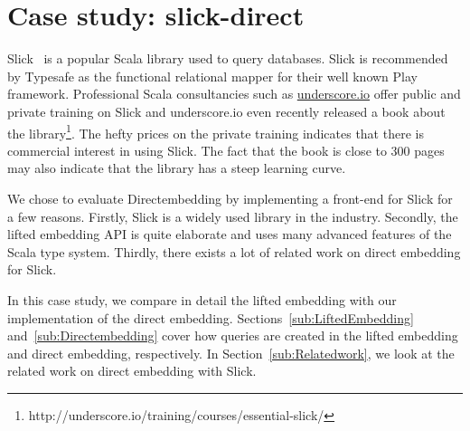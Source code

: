 \section{Case study: slick-direct} %
\label{sec:CaseStudy}
Slick~\autocite{typesafe_slick_2015} is a popular Scala library used to query databases.
Slick is recommended by Typesafe as the functional relational mapper for their well known Play framework.
Professional Scala consultancies such as \href{http://underscore.io}{underscore.io} offer public and private training on Slick and underscore.io even recently released a book about the library\footnote{http://underscore.io/training/courses/essential-slick/}.
The hefty prices on the private training indicates that there is commercial interest in using Slick.
The fact that the book is close to 300 pages may also indicate that the library has a steep learning curve.

We chose to evaluate Directembedding by implementing a front-end for Slick for a few reasons.
Firstly, Slick is a widely used library in the industry.
Secondly, the lifted embedding API is quite elaborate and uses many advanced features of the Scala type system.
Thirdly, there exists a lot of related work on direct embedding for Slick.

In this case study, we compare in detail the lifted embedding with our implementation of the direct embedding.
Sections~\ref{sub:LiftedEmbedding} and~\ref{sub:Directembedding} cover how queries are created in the lifted embedding and direct embedding, respectively.
In Section~\ref{sub:Relatedwork}, we look at the related work on direct embedding with Slick.

